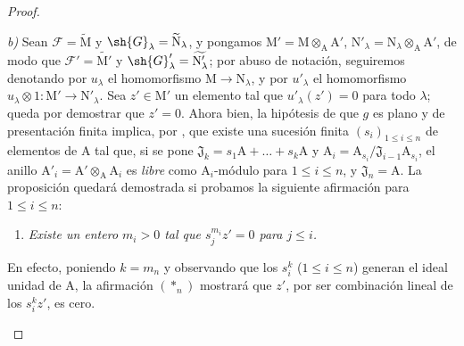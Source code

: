 \begin{proof}
\begin{enumerate}[label=(\roman*)]
  \emph{b)} Sean $\mathscr{F}=\widetilde{\mathrm{M}}$ y $\sh{G}_\lambda=\widetilde{\mathrm{N}}_\lambda$, y pongamos $\mathrm{M}'=\mathrm{M}\otimes_\mathrm{A}\mathrm{A}'$, $\mathrm{N}'_\lambda=\mathrm{N}_\lambda\otimes_\mathrm{A}\mathrm{A}'$, de modo que $\mathscr{F}'=\widetilde{\mathrm{M}'}$ y $\sh{G}'_\lambda=\widetilde{\mathrm{N}'_\lambda}$; por abuso de notación, seguiremos denotando por $u_\lambda$ el homomorfismo $\mathrm{M}\to\mathrm{N}_\lambda$, y por $u'_\lambda$ el homomorfismo $u_\lambda\otimes 1:\mathrm{M}'\to\mathrm{N}'_\lambda$.
  Sea $z'\in\mathrm{M}'$ un elemento tal que $u'_\lambda(z')=0$ para todo $\lambda$; queda por demostrar que $z'=0$.
  Ahora bien, la hipótesis de que $g$ es plano y de presentación finita implica, por , que existe una sucesión finita $(s_i)_{1\leq i\leq n}$ de elementos de $\mathrm{A}$ tal que, si se pone $\mathfrak{J}_k=s_1\mathrm{A}+\ldots+s_k\mathrm{A}$ y $\mathrm{A}_i=\mathrm{A}_{s_i}/\mathfrak{J}_{i-1}\mathrm{A}_{s_i}$, el anillo $\mathrm{A}'_i=\mathrm{A}'\otimes_\mathrm{A}\mathrm{A}_i$ es \emph{libre} como $\mathrm{A}_i$-módulo para $1\leq i\leq n$, y $\mathfrak{J}_n=\mathrm{A}$.
  La proposición quedará demostrada si probamos la siguiente afirmación para $1\leq i\leq n$:
  \begin{enumerate}[label=$(*_i)$]
    \item \emph{Existe un entero $m_i>0$ tal que $s_j^{m_i}z'=0$ para $j\leq i$.}
  \end{enumerate}
  En efecto, poniendo $k=m_n$ y observando que los $s_i^k$ ($1\leq i\leq n$) generan el ideal unidad de $\mathrm{A}$, la afirmación $(*_n)$ mostrará que $z'$, por ser combinación lineal de los $s_i^k z'$, es cero.


\end{enumerate}
\end{proof}
